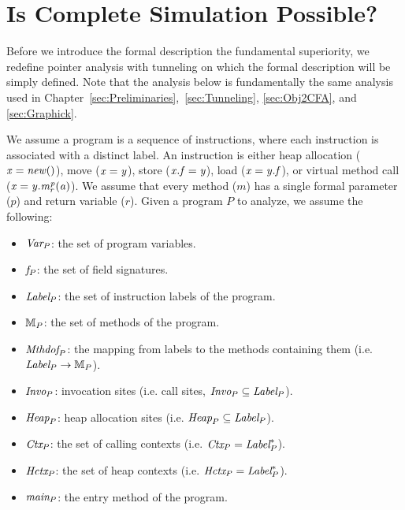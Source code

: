 
\chapter{Is Complete Simulation Possible?}\label{sec:appendix}
Before we introduce the formal description the fundamental superiority, we redefine pointer analysis with tunneling on which the formal description will be simply defined. Note that the analysis below is fundamentally the same analysis used in Chapter~\ref{sec:Preliminaries},~\ref{sec:Tunneling}, \ref{sec:Obj2CFA}, and \ref{sec:Graphick}.



\label{sec:pointeranalysis}


We assume a program is a sequence of instructions, where each
instruction is associated with a distinct label.  An instruction is
either heap allocation (${\it x = new()}$), move (${\it x = y}$), 
store (${\it x.f = y}$), load (${\it x = y.f}$),
or
virtual method call (${\it x = y.m_r^{p}(a)}$).  We
assume that every method ($m$) has a single formal parameter ($p$) and
return variable ($r$). 
Given a program $P$ to analyze, we assume the following:
\begin{itemize}[leftmargin=1.4em]
\item $\text{\it Var}_P$: the set of program variables.
\item ${\it f}_P$: the set of field signatures.
\item $\text{\it Label}_P$: the set of instruction labels of the program.
\item ${\mathbb{M}}_P$: the set of methods of the program.
\item $\text{\it Mthdof}_P$: the mapping from labels to the
methods containing them (i.e. $\text{\it Label}_P \to {\mathbb{M}}_P$).
\item $\text{\it Invo}_P$: invocation sites (i.e. call sites, $\text{\it Invo}_P \subseteq \text{\it Label}_P$).
\item $\text{\it Heap}_P$: heap allocation sites (i.e. $\text{\it Heap}_P \subseteq \text{\it Label}_P$).
\item $\text{\it Ctx}_P$: the set of calling contexts (i.e. $\text{\it Ctx}_P = \text{\it Label}_P^*$).
\item $\text{\it Hctx}_P$: the set of heap contexts (i.e. $\text{\it Hctx}_P = \text{\it Label}_P^*$).
\item $\text{\it main}_P$: the entry method of the program.
\end{itemize}


